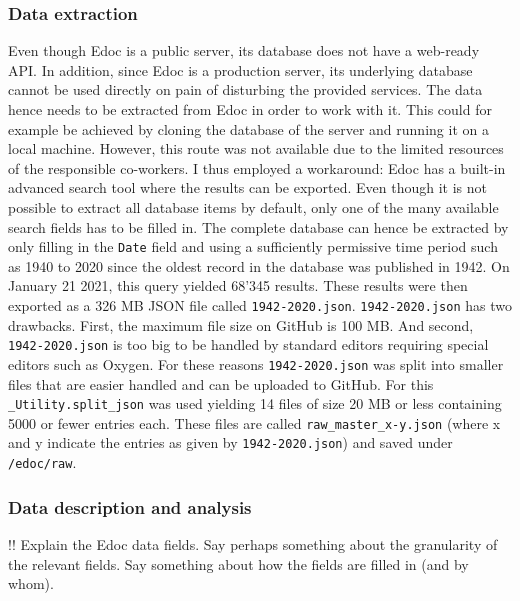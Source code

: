 \hypertarget{data-extraction}{%
\subsubsection{Data extraction}\label{data-extraction}}

Even though Edoc is a public server, its database does not have a
web-ready API. In addition, since Edoc is a production server, its
underlying database cannot be used directly on pain of disturbing the
provided services. The data hence needs to be extracted from Edoc in
order to work with it. This could for example be achieved by cloning the
database of the server and running it on a local machine. However, this
route was not available due to the limited resources of the responsible
co-workers. I thus employed a workaround: Edoc has a built-in advanced
search tool where the results can be exported. Even though it is not
possible to extract all database items by default, only one of the many
available search fields has to be filled in. The complete database can
hence be extracted by only filling in the \texttt{Date} field and using
a sufficiently permissive time period such as 1940 to 2020 since the
oldest record in the database was published in 1942. On January 21 2021,
this query yielded 68'345 results. These results were then exported as a
326 MB JSON file called \texttt{1942-2020.json}. \texttt{1942-2020.json}
has two drawbacks. First, the maximum file size on GitHub is 100 MB. And
second, \texttt{1942-2020.json} is too big to be handled by standard
editors requiring special editors such as Oxygen. For these reasons
\texttt{1942-2020.json} was split into smaller files that are easier
handled and can be uploaded to GitHub. For this
\texttt{\_Utility.split\_json} was used yielding 14 files of size 20 MB
or less containing 5000 or fewer entries each. These files are called
\texttt{raw\_master\_x-y.json} (where x and y indicate the entries as
given by \texttt{1942-2020.json}) and saved under \texttt{/edoc/raw}.

\hypertarget{data-description-and-analysis}{%
\subsubsection{Data description and
analysis}\label{data-description-and-analysis}}

!! Explain the Edoc data fields. Say perhaps something about the
granularity of the relevant fields. Say something about how the fields
are filled in (and by whom).

